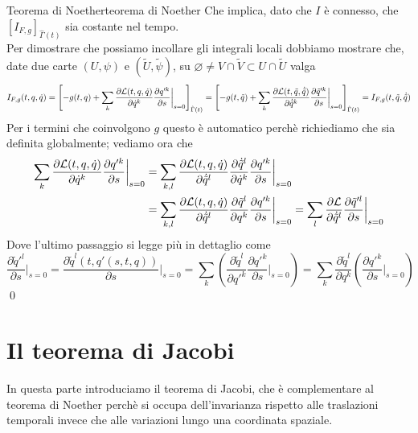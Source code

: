 \documentclass[openany]{book}
\begin{document}
\begin{theorem}{Teorema di Noether}{teorema di Noether}
    Che implica, dato che $I$ è connesso, che $[I_{F,g}]_{\hat\Gamma(t)}$ sia costante nel tempo.\\
    Per dimostrare che possiamo incollare gli integrali locali dobbiamo mostrare che, date due carte $(U,\psi)$ e $(\tilde U, \tilde \psi)$, su $\varnothing \neq V\cap \tilde V \subset U\cap \tilde U$ valga 
    \[ I_{F,g}(t,q,\dot q) = \left[ -g(t,q) + \sum_k \frac{\partial \mathcal{L}(t,q,\dot q)}{\partial \dot q^k}\frac{\partial q'^k}{\partial s}\bigg|_{s=0} \right]_{\hat\Gamma(t)} = \left[ -g(t,\tilde q) + \sum_k \frac{\partial \mathcal{L}(t,\tilde q,\dot{\tilde q})}{\partial \dot{\tilde q}^k}\frac{\partial \tilde q'^k}{\partial s}\bigg|_{s=0} \right]_{\hat\Gamma(t)} = I_{F,g}(t,\tilde q,\dot {\tilde q}) \]
    Per i termini che coinvolgono $g$ questo è automatico perchè richiediamo che sia definita globalmente; vediamo ora che 
    \begin{align*}
        \sum_k \frac{\partial \mathcal{L}(t,q,\dot q)}{\partial \dot q^k}\frac{\partial q'^k}{\partial s}\bigg|_{s=0} & = \sum_{k,l} \frac{\partial \mathcal{L}(t,q,\dot q)}{\partial \dot{\tilde q}^l} \frac{\partial \dot{\tilde q}^l}{\partial \dot q^k} \frac{\partial q'^k}{\partial s}\bigg|_{s=0} \\ & = \sum_{k,l} \frac{\partial \mathcal{L}(t,q,\dot q)}{\partial \dot{\tilde q}^l} \frac{\partial \tilde q^l}{\partial q^k} \frac{\partial q'^k}{\partial s}\bigg|_{s=0} = \sum_l \frac{\partial \mathcal{L}}{\partial \dot{\tilde q }^l }\frac{ \partial \tilde q'^l}{\partial s}\bigg|_{s=0}
    \end{align*}
    Dove l'ultimo passaggio si legge più in dettaglio come 
    \[ \frac{\partial \tilde q'^l}{\partial s}\bigg|_{s=0} = \frac{\partial \tilde q^l(t, q'(s,t,q))}{\partial s}\bigg|_{s=0} = \sum_k \left( \frac{\partial \tilde q^l}{\partial q'^k}\frac{\partial q'^k}{\partial s}\bigg|_{s=0} \right) = \sum_k \frac{\partial \tilde q^l}{\partial q^k} \left( \frac{\partial q'^k}{\partial s}\bigg|_{s=0} \right)\]
    \qed
\end{theorem}

\newpage
\renewcommand\H{\mc H}
\section{Il teorema di Jacobi}

In questa parte introduciamo il teorema di Jacobi, che è complementare al teorema di Noether perchè si occupa dell'invarianza rispetto alle traslazioni temporali invece che alle variazioni lungo una coordinata spaziale.
\end{document}
